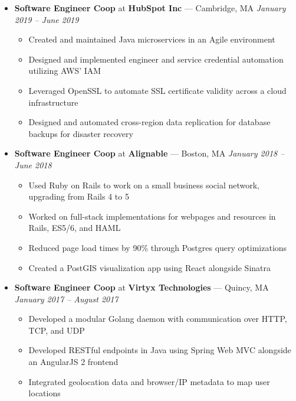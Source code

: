 \documentclass{article}
\begin{document}
\begin{itemize}[label={},leftmargin=*]
  \item \textbf{Software Engineer Coop} at \textbf{HubSpot Inc} --- Cambridge, MA \hfill {\em January 2019 -- June 2019}
  \begin{itemize}[label={$\bullet$}]
    \item Created and maintained Java microservices in an Agile environment
    \item Designed and implemented engineer and service credential automation utilizing AWS' IAM
    \item Leveraged OpenSSL to automate SSL certificate validity across a cloud infrastructure
    \item Designed and automated cross-region data replication for database backups for disaster recovery

  \end{itemize}

  \item \textbf{Software Engineer Coop} at \textbf{Alignable} --- Boston, MA \hfill {\em January 2018 -- June 2018}
  \begin{itemize}[label={$\bullet$}]
    \item Used Ruby on Rails to work on a small business social network, upgrading from Rails 4 to 5
    \item Worked on full-stack implementations for webpages and resources in Rails, ES5/6, and HAML
    \item Reduced page load times by 90\% through Postgres query optimizations 
    \item Created a PostGIS visualization app using React alongside Sinatra

  \end{itemize}

  \item \textbf{Software Engineer Coop} at \textbf{Virtyx Technologies} --- Quincy, MA \hfill {\em January 2017 -- August 2017}
  \begin{itemize}[label={$\bullet$}]
    \item Developed a modular Golang daemon with communication over HTTP, TCP, and UDP
    \item Developed RESTful endpoints in Java using Spring Web MVC alongside an AngularJS 2 frontend
    \item Integrated geolocation data and browser/IP metadata to map user locations

  \end{itemize}
\end{itemize}
\end{document}
